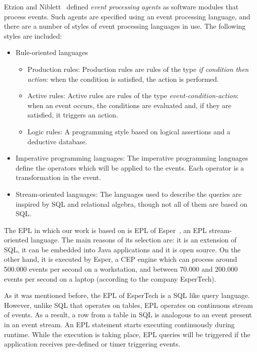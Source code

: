 \documentclass[conference]{IEEEtran}
\theoremstyle{definition}
\begin{document}
Etzion and Niblett~\cite{Etz10} defined \textit{event processing agents} as software modules that process events. Such agents are specified using an 
event processing language, and there are a number of styles of event processing languages in use. The following styles are included:

\begin{itemize}
 \item Rule-oriented languages
 \begin{itemize}
 \item Production rules: Production rules are rules of the type \textit{if condition then action}: when the condition is satisfied, the action is performed.
 \item Active rules: Active rules are rules of the type \textit{event-condition-action}: when an event occurs, the conditions are evaluated and, if they are satisfied, 
 it triggers an action.
 \item Logic rules: A programming style based on logical assertions and a deductive database. 
 \end{itemize}
 \item Imperative programming languages: The imperative programming languages define the operators which will be applied to the events. Each operator is a
 transformation in the event.
 \item Stream-oriented languages: The languages used to describe the queries are inspired by SQL and relational algebra, though not all of them are 
 based on SQL.
\end{itemize}

The EPL in which our work is based on is EPL of Esper~\cite{Esper:2016}, an EPL stream-oriented language. The main reasons of its selection are: 
it is an extension of SQL, it can be embedded into Java applications and it is open source. On the other hand, it is executed by Esper, a
CEP engine which can process around 500.000 events per second on a workstation, and between 70.000 and 200.000 events per second on a laptop (according to 
the company EsperTech).
 
As it was mentioned before, the EPL of EsperTech is a SQL like query language. However, unlike SQL that operates on tables, EPL operates on continuous stream of events. As a 
result, a row from a table in SQL is analogous to an event present in an event stream. An EPL statement starts executing continuously during 
runtime. While the execution is taking place, EPL queries will be triggered if the application receives pre-defined or timer triggering events.
 
\end{document}
